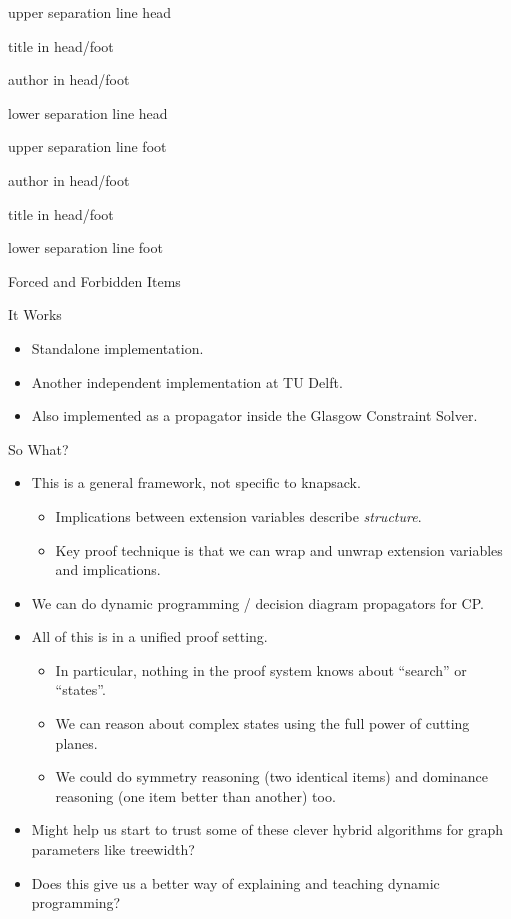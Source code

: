 \documentclass[aspectratio=169,compress,10pt]{beamer}
\makeatletter
\newenvironment{nearlyplainframe}[2][]{
    \def\beamer@entrycode{\vspace*{-\headheight}\vspace*{3pt}}
    \setbeamertemplate{headline}
    {%
        \begin{beamercolorbox}[colsep=1.5pt]{upper separation line head}
        \end{beamercolorbox}
        \begin{beamercolorbox}[ht=0.5ex,dp=0.125ex,%
            leftskip=.3cm,rightskip=.3cm plus1fil]{title in head/foot}%
        \end{beamercolorbox}%
        \begin{beamercolorbox}[ht=0.5ex,dp=0.125ex,%
            leftskip=.3cm,rightskip=.3cm plus1fil]{author in head/foot}%
        \end{beamercolorbox}%
        \begin{beamercolorbox}[colsep=1.5pt]{lower separation line head}
        \end{beamercolorbox}
        \vspace*{\headheight}
    }

    \setbeamertemplate{footline}
    {%
        \begin{beamercolorbox}[colsep=1.5pt]{upper separation line foot}
        \end{beamercolorbox}
        \begin{beamercolorbox}[ht=0.5ex,dp=0.125ex,%
            leftskip=.3cm,rightskip=.3cm plus1fil]{author in head/foot}%
        \end{beamercolorbox}%
        \begin{beamercolorbox}[ht=0.5ex,dp=0.125ex,%
            leftskip=.3cm,rightskip=.3cm plus1fil]{title in head/foot}%
        \end{beamercolorbox}%
        \begin{beamercolorbox}[colsep=1.5pt]{lower separation line foot}
        \end{beamercolorbox}
    }

    \begin{frame}[#1]{#2}
    }{
    \end{frame}
}
\makeatother
\begin{document}
\begin{nearlyplainframe}[t]{Forced and Forbidden Items}
\end{nearlyplainframe}

\begin{frame}{It Works}
    \begin{itemize}
        \item Standalone implementation.
        \item Another independent implementation at TU Delft.
        \item Also implemented as a propagator inside the Glasgow Constraint Solver.
    \end{itemize}
\end{frame}

\begin{frame}{So What?}
    \begin{itemize}
        \item This is a general framework, not specific to knapsack.
            \begin{itemize}
                \item Implications between extension variables describe \emph{structure}.
                \item Key proof technique is that we can wrap and unwrap extension variables and implications.
            \end{itemize}
        \item We can do dynamic programming / decision diagram propagators for CP.
        \item All of this is in a unified proof setting.
            \begin{itemize}
                \item In particular, nothing in the proof system knows about ``search'' or
                    ``states''.
                \item We can reason about complex states using the full power of cutting
                    planes.
                \item We could do symmetry reasoning (two identical items) and dominance reasoning
                    (one item better than another) too.
            \end{itemize}
        \item Might help us start to trust some of these clever hybrid algorithms
            for graph parameters like treewidth?
        \item Does this give us a better way of explaining and teaching dynamic programming?
    \end{itemize}
\end{frame}
\end{document}
